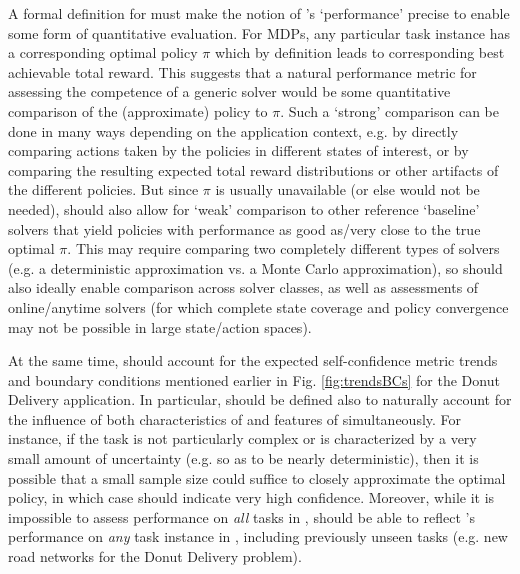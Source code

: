 A formal definition for \xQ{} must make the notion of \solve{}'s `performance' precise to enable some form of quantitative evaluation. For MDPs, any particular task instance \task{} has a corresponding optimal policy $\pi$ which by definition leads to corresponding best achievable total reward. This suggests that a natural performance metric for assessing the competence of a generic solver \solve{} would be some quantitative comparison of the (approximate) policy \tpi{} to $\pi$. Such a `strong' comparison can be done in many ways depending on the application context, e.g. by directly comparing actions taken by the policies in different states of interest, or by comparing the resulting expected total reward distributions or other artifacts of the different policies. 
But since $\pi$ is usually unavailable (or else \solve{} would not be needed), \xQ{} should also allow for `weak' comparison to other reference `baseline' solvers that yield policies with performance as good as/very close to the true optimal $\pi$. This may require comparing two completely different types of solvers (e.g. a deterministic approximation vs. a Monte Carlo approximation), so \xQ{} should also ideally enable comparison across solver classes, as well as assessments of online/anytime solvers (for which complete state coverage and policy convergence may not be possible in large state/action spaces).
 
At the same time, \xQ{} should account for the expected self-confidence metric trends and boundary conditions mentioned earlier in Fig. \ref{fig:trendsBCs} for the Donut Delivery application. In particular, \xQ{} should be defined also to naturally account for the influence of both characteristics of \solve{} and features of \task{} simultaneously. For instance, if the task \task{} is not particularly complex or is characterized by a very small amount of uncertainty (e.g. so as to be nearly deterministic), then it is possible that a small sample size could suffice to closely approximate the optimal policy, in which case \xQ{} should indicate very high confidence. Moreover, while it is impossible to assess performance on \emph{all} tasks in \taskclass{}, \xQ{} should be able to reflect \solve{}'s performance on \emph{any} task instance \task{} in \taskclass{}, including previously unseen tasks (e.g. new road networks for the Donut Delivery problem). 

